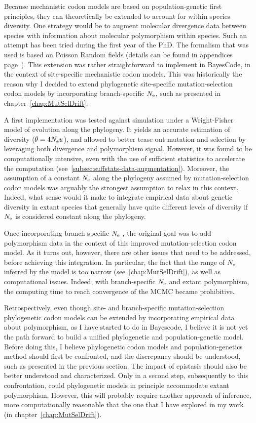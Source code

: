 Because mechanistic codon models are based on population-genetic first principles, they can theoretically be extended to account for within species diversity.
One strategy would be to augment molecular divergence data between species with information about molecular polymorphism within species.
Such an attempt has been tried during the first year of the PhD.
The formalism that was used is based on Poisson Random fields (details can be found in appendices page~\pageref{sec-appendix:PRF}).
This extension was rather straightforward to implement in BayesCode, in the context of site-specific mechanistic codon models.
This was historically the reason why I decided to extend phylogenetic site-specific mutation-selection codon models by incorporating branch-specific $N_{\textrm{e}}$, such as presented in chapter~\ref{chap:MutSelDrift}.

A first implementation was tested against simulation under a Wright-Fisher model of evolution along the phylogeny.
It yields an accurate estimation of diversity ($\theta = 4 N_{\textrm{e}} u$), and allowed to better tease out mutation and selection by leveraging both divergence and polymorphism signal.
However, it was found to be computationally intensive, even with the use of sufficient statistics to accelerate the computation (see~\ref{subsec:suffstats-data-augmentation}).
Moreover, the assumption of a constant $N_{\textrm{e}}$ along the phylogeny assumed by mutation-selection codon models was arguably the strongest assumption to relax in this context.
Indeed, what sense would it make to integrate empirical data about genetic diversity in extant species that generally have quite different levels of diversity if $N_{\textrm{e}}$ is considered constant along the phylogeny.

Once incorporating branch specific $N_{\textrm{e}}$ , the original goal was to add polymorphism data in the context of this improved mutation-selection codon model.
As it turns out, however, there are other issues that need to be addressed, before achieving this integration.
In particular, the fact that the range of $N_{\textrm{e}}$ inferred by the model is too narrow (see~\ref{chap:MutSelDrift}), as well as computational issues.
Indeed, with branch-specific $N_{\textrm{e}}$ and extant polymorphism, the computing time to reach convergence of the MCMC became prohibitive.

Retrospectively, even though site- and branch-specific mutation-selection phylogenetic codon models can be extended by incorporating empirical data about polymorphism, as I have started to do in Bayescode, I believe it is not yet the path forward to build a unified phylogenetic and population-genetic model.
Before doing this, I believe phylogenetic codon models and population-genetics method should first be confronted, and the discrepancy should be understood, such as presented in the previous section.
The impact of epistasis should also be better understood and characterized.
Only in a second step, subsequently to this confrontation, could phylogenetic models in principle accommodate extant polymorphism.
However, this will probably require another approach of inference, more computationally reasonable that the one that I have explored in my work (in chapter~\ref{chap:MutSelDrift}).


